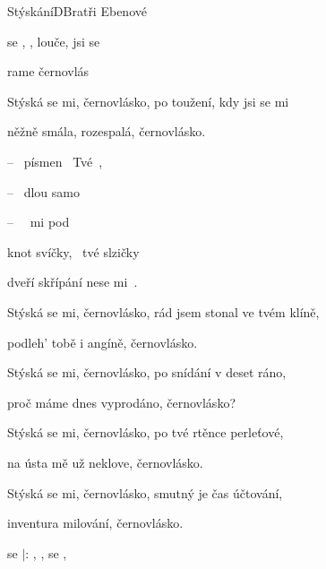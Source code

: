 \begin{song}{Stýskání}{D}{Bratři Ebenové}
\begin{SBVerse}
 se , ,  louče,  jsi se  

 rame  černovlás

\end{SBVerse}
\begin{SBVerse}

Stýská se mi, černovlásko, po toužení, kdy jsi se mi

něžně smála, rozespalá, černovlásko.

\end{SBVerse}
\begin{SBChorus}
 --  písmen  Tvé ,

 --  dlou samo

 --   mi pod 

 knot svíčky,  tvé slzičky

dveří skřípání nese mi .

  \end{SBChorus}
\begin{SBVerse}
Stýská se mi, černovlásko, rád jsem stonal ve tvém klíně,

podleh' tobě i angíně, černovlásko.
\end{SBVerse}
\begin{SBVerse}

Stýská se mi, černovlásko, po snídání v deset ráno,

proč máme dnes vyprodáno, černovlásko?

  \end{SBVerse}
  \begin{SBVerse}
Stýská se mi, černovlásko, po tvé rtěnce perleťové,

na ústa mě už neklove, černovlásko.

\end{SBVerse}
\begin{SBVerse}

Stýská se mi, černovlásko, smutný je čas účtování,

inventura milování, černovlásko.

  \end{SBVerse}
\begin{SBChorus*}
  se $|$: , ,   se , 
 \end{SBChorus*}
 \end{song}

\pagebreak